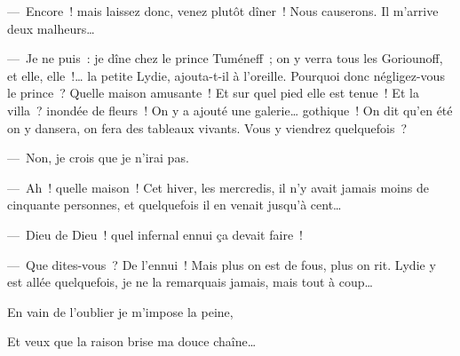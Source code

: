 \documentclass[french,twoside]{book} %
\begin{document}
— Encore ! mais laissez donc, venez plutôt dîner ! Nous causerons. Il m’arrive deux malheurs…\par
— Je ne puis : je dîne chez le prince Tuméneff ; on y verra tous les Goriounoff, et elle, elle !… la petite Lydie, ajouta-t-il à l’oreille. Pourquoi donc négligez-vous le prince ? Quelle maison amusante ! Et sur quel pied elle est tenue ! Et la villa ? inondée de fleurs ! On y a ajouté une galerie… gothique ! On dit qu’en été on y dansera, on fera des tableaux vivants. Vous y viendrez quelquefois ?\par
— Non, je crois que je n’irai pas.\par
— Ah ! quelle maison ! Cet hiver, les mercredis, il n’y avait jamais moins de cinquante personnes, et quelquefois il en venait jusqu’à cent…\par
— Dieu de Dieu ! quel infernal ennui ça devait faire !\par
— Que dites-vous ? De l’ennui ! Mais plus on est de fous, plus on rit. Lydie y est allée quelquefois, je ne la remarquais jamais, mais tout à coup…\par

\begin{center}
\noindent En vain de l’oublier je m’impose la peine,\par
\end{center}


\begin{center}
\noindent Et veux que la raison brise ma douce chaîne…\par
\end{center}
\end{document}
